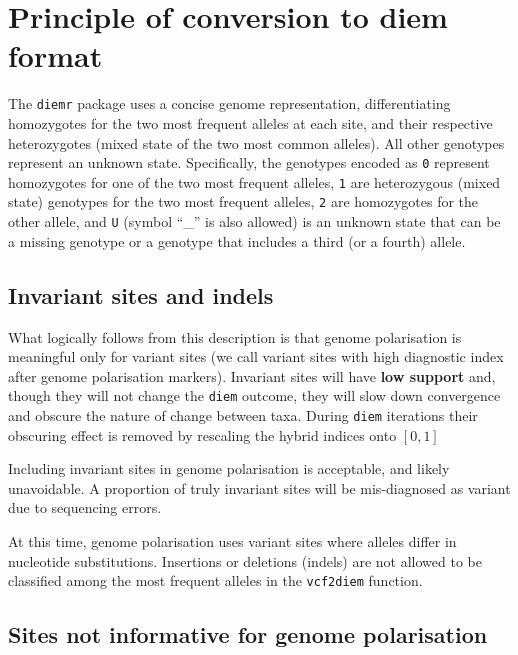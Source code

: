\documentclass[
]{book}
\begin{document}
\section{Principle of conversion to diem format}\label{principle-of-conversion-to-diem-format}

The \texttt{diemr} package uses a concise genome representation, differentiating homozygotes for the two most frequent alleles at each site, and their respective heterozygotes (mixed state of the two most common alleles). All other genotypes represent an unknown state. Specifically, the genotypes encoded as \texttt{0} represent homozygotes for one of the two most frequent alleles,
\texttt{1} are heterozygous (mixed state) genotypes for the two most frequent alleles,
\texttt{2} are homozygotes for the other allele,
and \texttt{U} (symbol ``\_'' is also allowed) is an unknown state that can be a missing genotype or a genotype that includes a third (or a fourth) allele.

\subsection{Invariant sites and indels}\label{invariant-sites-and-indels}

What logically follows from this description is that genome polarisation is meaningful only for variant sites (we call variant sites with high diagnostic index after genome polarisation markers). Invariant sites will have \textbf{low support} and, though they will not change the \texttt{diem} outcome, they will slow down convergence and obscure the nature of change between taxa. During \texttt{diem} iterations their obscuring effect is removed by rescaling the hybrid indices onto \([0,1]\)

Including invariant sites in genome polarisation is acceptable, and likely unavoidable. A proportion of truly invariant sites will be mis-diagnosed as variant due to sequencing errors.

At this time, genome polarisation uses variant sites where alleles differ in nucleotide substitutions. Insertions or deletions (indels) are not allowed to be classified among the most frequent alleles in the \texttt{vcf2diem} function.

\subsection{Sites not informative for genome polarisation}\label{sites-not-informative-for-genome-polarisation}
\end{document}
